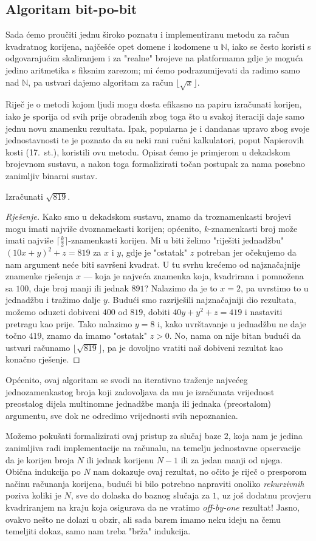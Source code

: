 \documentclass[12pt]{scrartcl}
\newcommand{\primjer}[2]{%
    \renewcommand\qedsymbol{$\vartriangleleft$}%
    \begin{example}%
        #1%
    \end{example}%
    \begin{proof}[Rješenje]%
        #2%
    \end{proof}%
    \renewcommand\qedsymbol{$\square$}
}
\begin{document}
\subsection{Algoritam bit-po-bit}
Sada ćemo proučiti jednu široko poznatu i implementiranu metodu za račun kvadratnog korijena, najčešće opet domene i kodomene u
$\mathbb{N}$, iako se često koristi s odgovarajućim skaliranjem i za "realne" brojeve
 na platformama gdje je moguća jedino aritmetika s fiksnim zarezom; mi ćemo podrazumijevati da radimo samo nad $\mathbb N$, pa ustvari
 dajemo algoritam za račun $\lfloor\sqrt x\rfloor$.

Riječ je o metodi kojom ljudi mogu dosta efikasno na papiru izračunati korijen, iako je sporija od svih prije obrađenih zbog toga
što u svakoj iteraciji daje samo jednu novu znamenku rezultata. Ipak, popularna je i dandanas upravo zbog svoje jednostavnosti te je
poznato da su neki rani ručni kalkulatori, poput Napierovih kosti (17.\ st.), koristili ovu metodu.
 Opisat ćemo je primjerom
u dekadskom brojevnom sustavu, a nakon toga formalizirati točan postupak za nama posebno zanimljiv binarni sustav.

\primjer{Izračunati $\sqrt{819}$.}
{Kako smo u dekadskom sustavu, znamo da troznamenkasti brojevi mogu imati najviše dvoznamekasti korijen; općenito, $k$-znamenkasti broj
može imati najviše $\lceil\frac{k}{2}\rceil$-znamenkasti korijen. Mi u biti želimo "riješiti jednadžbu" $(10x+y)^2+z=819$ za $x$ i $y$, gdje je 
"ostatak" $z$ potreban jer očekujemo da nam argument neće biti savršeni kvadrat. U tu svrhu krećemo od najznačajnije znamenke rješenja
$x$ --- koja je najveća znamenka koja, kvadrirana i pomnožena sa $100$, daje broj manji ili jednak $891$? Nalazimo da je to $x=2$, pa
uvrstimo to u jednadžbu i tražimo dalje $y$. Budući smo razriješili najznačajniji dio rezultata, možemo oduzeti dobiveni $400$ od $819$,
dobiti $40y+y^2+z=419$
i nastaviti pretragu kao prije. Tako nalazimo $y=8$ i, kako uvrštavanje u jednadžbu ne daje točno $419$,
znamo da imamo "ostatak" $z>0$. No, nama on nije bitan budući da ustvari računamo $\lfloor\sqrt{819}\rfloor$, pa je
 dovoljno vratiti naš dobiveni rezultat kao konačno rješenje.}

Općenito, ovaj algoritam se svodi na iterativno traženje najvećeg jednozamenkastog
broja koji zadovoljava da mu je izračunata vrijednost preostalog dijela multinomne jednadžbe manja ili jednaka (preostalom) argumentu, sve
dok ne odredimo vrijednosti svih nepoznanica.

Možemo pokušati formalizirati ovaj pristup za slučaj baze $2$, koja nam je jedina zanimljiva radi implementacije na računalu, na temelju
jednostavne opservacije da je korijen broja $N$ ili jednak korijenu $N-1$ ili za jedan manji od njega. Obična indukcija po $N$ nam dokazuje
ovaj rezultat, no očito je riječ o presporom načinu računanja korijena, budući bi bilo potrebno napraviti onoliko \emph{rekurzivnih}
poziva koliki je $N$, sve do dolaska do baznog slučaja za $1$, uz još dodatnu provjeru kvadriranjem na kraju koja osigurava da ne vratimo
\textsl{off-by-one} rezultat! Jasno, ovakvo nešto ne dolazi u obzir, ali sada barem imamo neku ideju na čemu temeljiti dokaz, samo nam treba
"brža" indukcija.
\end{document}
